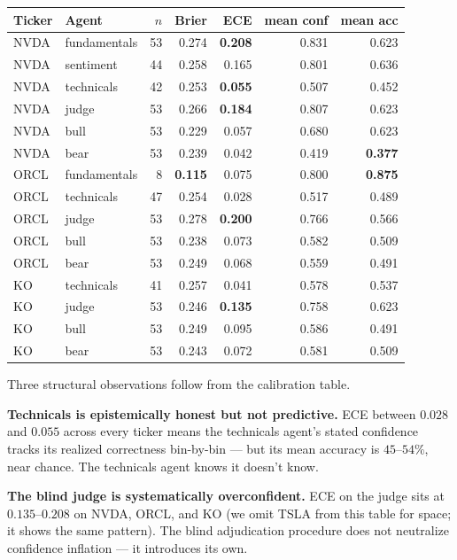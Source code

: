 \documentclass[11pt,a4paper]{article}
\begin{document}
\begin{center}\footnotesize
\begin{tabular}{llrrrrr}
\toprule
Ticker & Agent & $n$ & Brier & ECE & mean conf & mean acc \\
\midrule
NVDA & fundamentals & 53 & 0.274 & \textbf{0.208} & 0.831 & 0.623 \\
NVDA & sentiment    & 44 & 0.258 & 0.165          & 0.801 & 0.636 \\
NVDA & technicals   & 42 & 0.253 & \textbf{0.055} & 0.507 & 0.452 \\
NVDA & judge        & 53 & 0.266 & \textbf{0.184} & 0.807 & 0.623 \\
NVDA & bull         & 53 & 0.229 & 0.057          & 0.680 & 0.623 \\
NVDA & bear         & 53 & 0.239 & 0.042          & 0.419 & \textbf{0.377} \\
\midrule
ORCL & fundamentals &  8 & \textbf{0.115} & 0.075 & 0.800 & \textbf{0.875} \\
ORCL & technicals   & 47 & 0.254 & 0.028          & 0.517 & 0.489 \\
ORCL & judge        & 53 & 0.278 & \textbf{0.200} & 0.766 & 0.566 \\
ORCL & bull         & 53 & 0.238 & 0.073          & 0.582 & 0.509 \\
ORCL & bear         & 53 & 0.249 & 0.068          & 0.559 & 0.491 \\
\midrule
KO   & technicals   & 41 & 0.257 & 0.041          & 0.578 & 0.537 \\
KO   & judge        & 53 & 0.246 & \textbf{0.135} & 0.758 & 0.623 \\
KO   & bull         & 53 & 0.249 & 0.095          & 0.586 & 0.491 \\
KO   & bear         & 53 & 0.243 & 0.072          & 0.581 & 0.509 \\
\bottomrule
\end{tabular}
\end{center}

Three structural observations follow from the calibration table.

\textbf{Technicals is epistemically honest but not predictive.} ECE
between $0.028$ and $0.055$ across every ticker means the technicals
agent's stated confidence tracks its realized correctness bin-by-bin
--- but its mean accuracy is $45$--$54\%$, near chance. The technicals
agent knows it doesn't know.

\textbf{The blind judge is systematically overconfident.} ECE on the
judge sits at $0.135$--$0.208$ on NVDA, ORCL, and KO (we omit TSLA
from this table for space; it shows the same pattern). The blind
adjudication procedure does not neutralize confidence inflation --- it
introduces its own.
\end{document}
